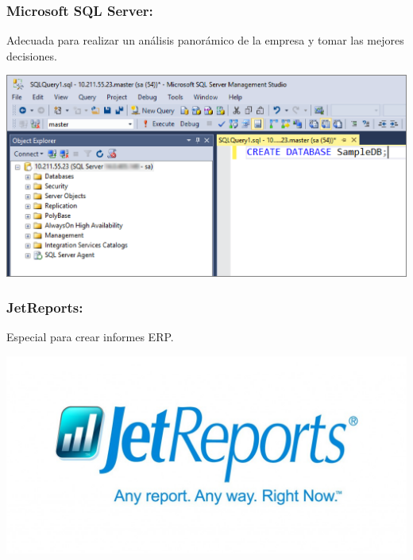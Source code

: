 \subsubsection{Microsoft SQL Server: }\label{sec:nada2}  
Adecuada para realizar un análisis panorámico de la empresa y tomar las mejores decisiones.
	\begin{center}
	\includegraphics[width=15cm]{./Imagenes/BIimagen8}
	\end{center}
	
\subsubsection{JetReports: }\label{sec:nada2}  
Especial para crear informes ERP.
	\begin{center}
	\includegraphics[width=15cm]{./Imagenes/BIimagen9}
	\end{center}
	
